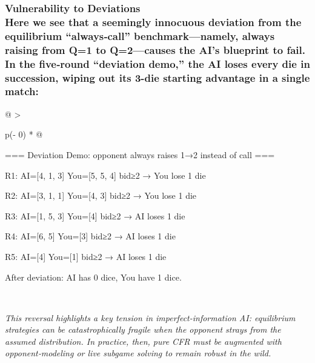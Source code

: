 \documentclass[
]{article}
\begin{document}
\subsubsection{\texorpdfstring{\textbf{Vulnerability to Deviations\\
}Here we see that a seemingly innocuous deviation from the equilibrium
``always‐call'' benchmark---namely, always raising from Q=1 to
Q=2---causes the AI's blueprint to fail. In the five‐round ``deviation
demo,'' the AI loses every die in succession, wiping out its 3-die
starting advantage in a single
match:}{Vulnerability to Deviations Here we see that a seemingly innocuous deviation from the equilibrium ``always‐call'' benchmark---namely, always raising from Q=1 to Q=2---causes the AI's blueprint to fail. In the five‐round ``deviation demo,'' the AI loses every die in succession, wiping out its 3-die starting advantage in a single match:}}\label{vulnerability-to-deviations-here-we-see-that-a-seemingly-innocuous-deviation-from-the-equilibrium-alwayscall-benchmarknamely-always-raising-from-q1-to-q2causes-the-ais-blueprint-to-fail.-in-the-fiveround-deviation-demo-the-ai-loses-every-die-in-succession-wiping-out-its-3-die-starting-advantage-in-a-single-match}

\begin{longtable}[]{@{}
  >{\raggedright\arraybackslash}p{(\columnwidth - 0\tabcolsep) * }@{}}
\toprule\noalign{}
\begin{minipage}[b]{\linewidth}\raggedright
=== Deviation Demo: opponent always raises 1→2 instead of call ===

R1: AI={[}4, 1, 3{]} You={[}5, 5, 4{]} bid≥2 → You lose 1 die

R2: AI={[}3, 1, 1{]} You={[}4, 3{]} bid≥2 → You lose 1 die

R3: AI={[}1, 5, 3{]} You={[}4{]} bid≥2 → AI loses 1 die

R4: AI={[}6, 5{]} You={[}3{]} bid≥2 → AI loses 1 die

R5: AI={[}4{]} You={[}1{]} bid≥2 → AI loses 1 die

After deviation: AI has 0 dice, You have 1 dice.
\end{minipage} \\
\midrule\noalign{}
\endhead
\bottomrule\noalign{}
\endlastfoot
\end{longtable}

\emph{This reversal highlights a key tension in imperfect-information
AI: equilibrium strategies can be catastrophically fragile when the
opponent strays from the assumed distribution. In practice, then, pure
CFR must be augmented with opponent‐modeling or live subgame solving to
remain robust in the wild.}
\end{document}
